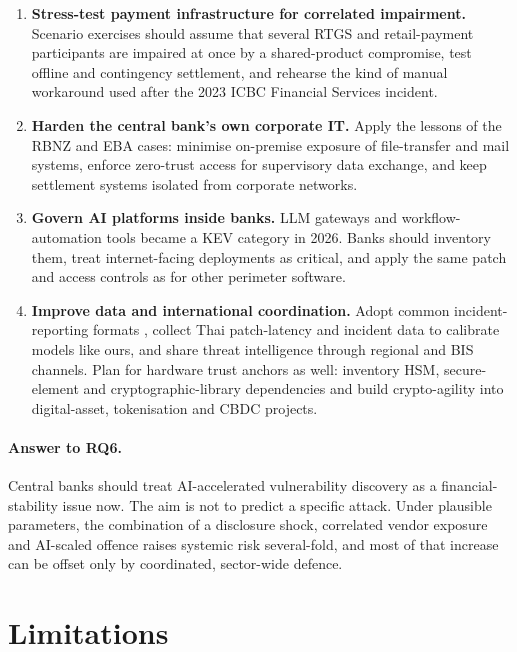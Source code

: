 \begin{enumerate}[leftmargin=1.6em]
\item \textbf{Stress-test payment infrastructure for correlated impairment.} Scenario exercises should assume that several RTGS and retail-payment participants are impaired at once by a shared-product compromise, test offline and contingency settlement, and rehearse the kind of manual workaround used after the 2023 ICBC Financial Services incident.
\item \textbf{Harden the central bank's own corporate IT.} Apply the lessons of the RBNZ and EBA cases: minimise on-premise exposure of file-transfer and mail systems, enforce zero-trust access for supervisory data exchange, and keep settlement systems isolated from corporate networks.
\item \textbf{Govern AI platforms inside banks.} LLM gateways and workflow-automation tools became a KEV category in 2026. Banks should inventory them, treat internet-facing deployments as critical, and apply the same patch and access controls as for other perimeter software.
\item \textbf{Improve data and international coordination.} Adopt common incident-reporting formats \citep{fsb2023reporting,fsb2025fire}, collect Thai patch-latency and incident data to calibrate models like ours, and share threat intelligence through regional and BIS channels. Plan for hardware trust anchors as well: inventory HSM, secure-element and cryptographic-library dependencies and build crypto-agility into digital-asset, tokenisation and CBDC projects.
\end{enumerate}

\paragraph{Answer to RQ6.} Central banks should treat AI-accelerated vulnerability discovery as a financial-stability issue now. The aim is not to predict a specific attack. Under plausible parameters, the combination of a disclosure shock, correlated vendor exposure and AI-scaled offence raises systemic risk several-fold, and most of that increase can be offset only by coordinated, sector-wide defence.

\section{Limitations}\label{sec:limits}

